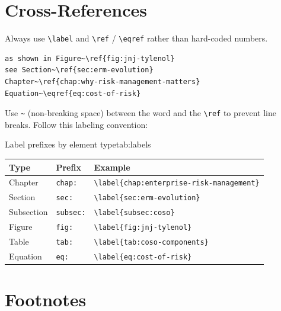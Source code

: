 \documentclass[11pt,openany]{book}
\newcommand{\code}[1]{\texttt{\small #1}}
\begin{document}
\section{Cross-References}
\label{sec:crossrefs}

Always use \code{\textbackslash label} and \code{\textbackslash ref} / \code{\textbackslash eqref} rather than hard-coded numbers.

\begin{lstlisting}
as shown in Figure~\ref{fig:jnj-tylenol}
see Section~\ref{sec:erm-evolution}
Chapter~\ref{chap:why-risk-management-matters}
Equation~\eqref{eq:cost-of-risk}
\end{lstlisting}

Use \code{\textasciitilde} (non-breaking space) between the word and the \code{\textbackslash ref} to prevent line breaks. Follow this labeling convention:

\begin{ermtable}{Label prefixes by element type}{tab:labels}
\begin{tabularx}{\linewidth}{llY}
\toprule
\textbf{Type} & \textbf{Prefix} & \textbf{Example} \\
\midrule
Chapter    & \code{chap:} & \code{\textbackslash label\{chap:enterprise-risk-management\}} \\
Section    & \code{sec:}  & \code{\textbackslash label\{sec:erm-evolution\}} \\
Subsection & \code{subsec:} & \code{\textbackslash label\{subsec:coso\}} \\
Figure     & \code{fig:}  & \code{\textbackslash label\{fig:jnj-tylenol\}} \\
Table      & \code{tab:}  & \code{\textbackslash label\{tab:coso-components\}} \\
Equation   & \code{eq:}   & \code{\textbackslash label\{eq:cost-of-risk\}} \\
\bottomrule
\end{tabularx}
\end{ermtable}


\section{Footnotes}
\label{sec:footnotes}
\end{document}
